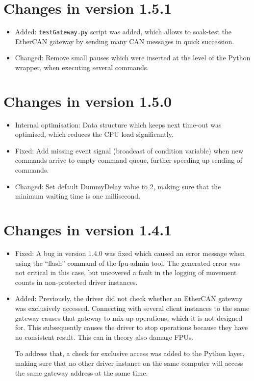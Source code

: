 \documentclass[fontsize=12,a4paper]{scrreprt}
\begin{document}
\section*{Changes in version 1.5.1}
\begin{itemize}

\item  Added: \texttt{testGateway.py}  script was added, which allows to soak-test the
  EtherCAN gateway by sending many CAN messages in quick succession.

\item Changed: Remove small pauses which were inserted at the level of
  the Python wrapper, when executing several commands.

\end{itemize}

\section*{Changes in version 1.5.0}
\begin{itemize}

\item  Internal optimisation: Data structure which keeps next time-out was optimised, which reduces
  the CPU load significantly.

\item Fixed: Add missing event signal (broadcast of condition variable) when new commands arrive
  to empty command queue, further speeding up sending of commands.

\item Changed: Set default DummyDelay value to 2, making sure that the
  minimum waiting time is one millisecond.

\end{itemize}


\section*{Changes in version 1.4.1}
\begin{itemize}


\item Fixed: A bug in version 1.4.0 was fixed which caused an error
  message when using the ``flash'' command of the fpu-admin tool. The
  generated error was not critical in this case, but uncovered a fault
  in the logging of movement counts in non-protected driver instances.

\item Added: Previously, the driver did not check whether an EtherCAN
  gateway was exclusively accessed. Connecting with several client
  instances to the same gateway causes that gateway to mix up
  operations, which it is not designed for. This subsequently causes
  the driver to stop operations because they have no consistent
  result. This can in theory also damage FPUs.

  To address that, a check for exclusive access was added to the
  Python layer, making sure that no other driver instance on the same
  computer will access the same gateway address at the same time.

\end{itemize}
\end{document}

